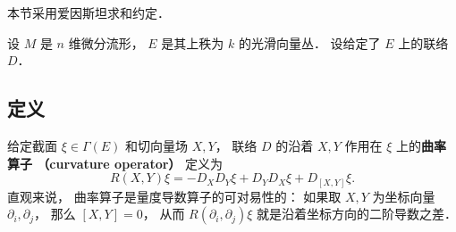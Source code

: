 

本节采用爱因斯坦求和约定．

设 $M$ 是 $n$ 维微分流形， $E$ 是其上秩为 $k$ 的光滑向量丛． 设给定了 $E$ 上的联络 $D$．

\subsection{定义}

给定截面 $\xi\in\Gamma(E)$ 和切向量场 $X,Y$， 联络 $D$ 的沿着 $X,Y$ 作用在 $\xi$ 上的\textbf{曲率算子 （curvature operator）} 定义为
$$
R(X,Y)\xi=-D_XD_Y\xi+D_YD_X\xi+D_{[X,Y]}\xi.
$$
直观来说， 曲率算子是量度导数算子的可对易性的： 如果取 $X,Y$ 为坐标向量 $\partial_i,\partial_j$， 那么 $[X,Y]=0$， 从而 $R(\partial_i,\partial_j)\xi$ 就是沿着坐标方向的二阶导数之差．

